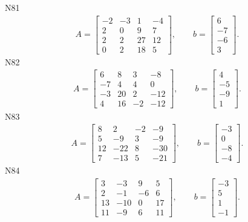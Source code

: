 \documentclass[11pt]{report}
\begin{document}
N81
\begin{align*}
 A = \left[\begin{matrix}-2 & -3 & 1 & -4\\2 & 0 & 9 & 7\\2 & 2 & 27 & 12\\0 & 2 & 18 & 5\end{matrix}\right],
\qquad b = \left[\begin{matrix}6\\-7\\-6\\3\end{matrix}\right]. 
 \end{align*}
N82
\begin{align*}
 A = \left[\begin{matrix}6 & 8 & 3 & -8\\-7 & 4 & 4 & 0\\-3 & 20 & 2 & -12\\4 & 16 & -2 & -12\end{matrix}\right],
\qquad b = \left[\begin{matrix}4\\-5\\-9\\1\end{matrix}\right]. 
 \end{align*}
N83
\begin{align*}
 A = \left[\begin{matrix}8 & 2 & -2 & -9\\5 & -9 & 3 & -9\\12 & -22 & 8 & -30\\7 & -13 & 5 & -21\end{matrix}\right],
\qquad b = \left[\begin{matrix}-3\\0\\-8\\-4\end{matrix}\right]. 
 \end{align*}
N84
\begin{align*}
 A = \left[\begin{matrix}3 & -3 & 9 & 5\\2 & -1 & -6 & 6\\13 & -10 & 0 & 17\\11 & -9 & 6 & 11\end{matrix}\right],
\qquad b = \left[\begin{matrix}-3\\5\\1\\-1\end{matrix}\right]. 
 \end{align*}
\end{document}
